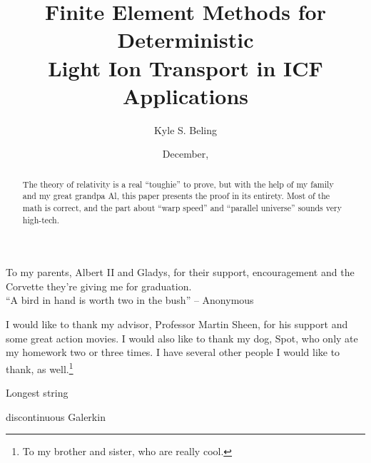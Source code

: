 \title{Finite Element Methods for Deterministic
    \\ Light Ion Transport in ICF Applications}

\author{Kyle S. Beling}





\date{December, \thisyear}

\maketitle

\begin{dedication}
  To my parents, Albert II and Gladys, for their support,
  encouragement and the Corvette they're giving me for graduation. \\[3ex]
  ``A bird in hand is worth two in the bush''
        -- Anonymous
\end{dedication}

\begin{acknowledgments}
    \vspace{1.1in}
    I would like to thank my advisor, Professor Martin Sheen, for his support
    and some great action movies.  I would also like to thank my dog, Spot,
    who only ate my homework two or three times.  I have several other people
    I would like to thank, as well.\footnote{To my brother and sister, who
    are really cool.}
\end{acknowledgments}

\maketitleabstract %

\begin{abstract}
    The theory of relativity is a real ``toughie'' to prove, but with the
    help of my family and my great grandpa Al, this paper presents the
    proof in its entirety.  Most of the math is correct, and the
    part about ``warp speed'' and ``parallel universe'' sounds very high-tech.
\clearpage %
\end{abstract}

\tableofcontents
\listoffigures
\listoftables

\begin{glossary}{Longest  string}
  \item[\dG]
      discontinuous Galerkin
\end{glossary}